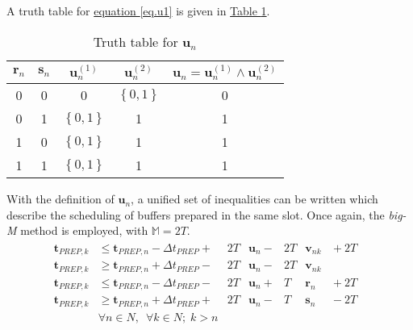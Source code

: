 A truth table for \hyperref[eq.u1]{equation \ref*{eq.u1}} is given in 
\hyperref[tbl.truthu]{Table \ref*{tbl.truthu}}.
\begin{table}[h!]
    \centering
    \caption{Truth table for $\boldsymbol{u}_{n}$}
    \label{tbl.truthu}
    \begin{tabular}{c c | c c | c}
        $\boldsymbol{r}_{n}$ & $\boldsymbol{s}_{n}$ &
        $\boldsymbol{u}_{n}^{\left( 1 \right)}$ &
        $\boldsymbol{u}_{n}^{\left( 2 \right)}$ &
        $\boldsymbol{u}_{n} = \boldsymbol{u}_{n}^{\left( 1 \right)}
            \land \boldsymbol{u}_{n}^{\left( 2 \right)}
        $\\ \hline
        0 & 0 & 0 & $\left\{ 0,1 \right\}$ & 0\\
        0 & 1 & $\left\{ 0,1 \right\}$ & 1 & 1\\
        1 & 0 & $\left\{ 0,1 \right\}$ & 1 & 1\\
        1 & 1 & $\left\{ 0,1 \right\}$ & 1 & 1\\
    \end{tabular}
\end{table}
With the definition of $\boldsymbol{u}_{n}$, a unified set of inequalities can
be written which describe the scheduling of buffers prepared in the same slot.
Once again, the \emph{big-M} method is employed, with $\mathbb{M} = 2T$.
\begin{equation}
    \begin{split}
        \begin{alignedat}{10}
            \boldsymbol{t}_{\mathit{PREP},k}
            &\le \boldsymbol{t}_{\mathit{PREP},n}
            - \Delta t_{\mathit{PREP}} {}+{} & 2T &\boldsymbol{u}_{n}
            {}-{} & 2T &\boldsymbol{v}_{nk} & {}+{} 2T&\\
            \boldsymbol{t}_{\mathit{PREP},k}
            &\ge \boldsymbol{t}_{\mathit{PREP},n}
            + \Delta t_{\mathit{PREP}} {}-{} & 2T &\boldsymbol{u}_{n}
            {}-{} & 2T &\boldsymbol{v}_{nk}&\\
            \boldsymbol{t}_{\mathit{PREP},k}
            &\le \boldsymbol{t}_{\mathit{PREP},n}
            - \Delta t_{\mathit{PREP}} {}-{} & 2T &\boldsymbol{u}_{n}
            {}+{} & T &\boldsymbol{r}_{n} & {}+{} 2T&\\
            \boldsymbol{t}_{\mathit{PREP},k}
            &\ge \boldsymbol{t}_{\mathit{PREP},n}
            + \Delta t_{\mathit{PREP}} {}+{} & 2T &\boldsymbol{u}_{n}
            {}-{} & T &\boldsymbol{s}_{n} & {}-{} 2T&\\
            &\forall n \in N, \enspace \forall k \in N; \; k > n
            \end{alignedat}            
    \end{split}
    \label{eq.k4}
\end{equation}

